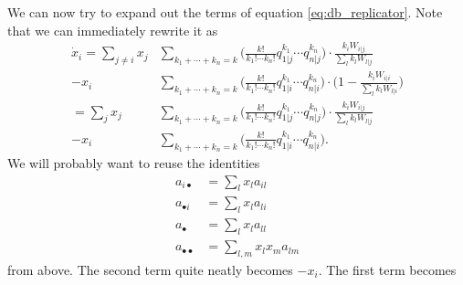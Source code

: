 \documentclass[14pt, a4paper, justified]{article}
\begin{document}
We can now try to expand out the terms of equation \ref{eq:db_replicator}.
Note that we can immediately rewrite it as
\begin{equation}
    \begin{split}
        \dot{x}_i = \sum_{j \neq i} x_j & \sum_{k_1 + \cdots + k_n = k} \Big( \frac{k!}{k_1! \cdots k_n!} q_{1|j}^{k_1} \cdots q_{n|j}^{k_n} \Big) \cdot \frac{k_i W_{i|j}}{\sum_l k_l W_{l|j}}
        \\
        - x_i & \sum_{k_1 + \cdots + k_n = k} \Big( \frac{k!}{k_1! \cdots k_n!} q_{1|i}^{k_1} \cdots q_{n|i}^{k_n} \Big) \cdot \Big( 1- \frac{k_i W_{i|i}}{\sum_l k_l W_{l|i}} \Big)
        \\
        = \sum_j x_j & \sum_{k_1 + \cdots + k_n = k} \Big( \frac{k!}{k_1! \cdots k_n!} q_{1|j}^{k_1} \cdots q_{n|j}^{k_n} \Big) \cdot \frac{k_i W_{i|j}}{\sum_l k_l W_{l|j}}
        \\
        - x_i & \sum_{k_1 + \cdots + k_n = k} \Big( \frac{k!}{k_1! \cdots k_n!} q_{1|i}^{k_1} \cdots q_{n|i}^{k_n} \Big).
    \end{split}
    \label{eq:db_replicator_rearranged}
\end{equation}
We will probably want to reuse the identities
\begin{equation}
    \begin{split}
        a_{i \bullet} & = \sum_l x_l a_{il}
        \\
        a_{\bullet i} & = \sum_l x_l a_{li}
        \\
        a_{\bullet} & = \sum_l x_l a_{ll}
        \\
        a_{\bullet \bullet} & = \sum_{l,m} x_l x_m a_{lm}
    \end{split}
\end{equation}
from above.
The second term quite neatly becomes $-x_i$.
The first term becomes
\end{document}
